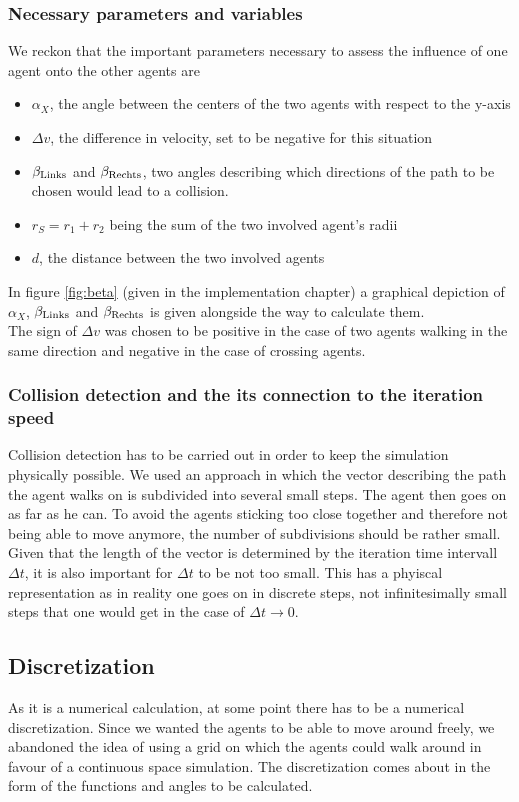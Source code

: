 \subsubsection{Necessary parameters and variables}
We reckon that the important parameters necessary to assess the influence of one agent onto the other agents are
\begin{itemize}
	\item $\alpha_X$, the angle between the centers of the two agents with respect to the y-axis
	\item $\Delta v$, the difference in velocity, set to be negative for this situation
	\item $\beta_{\text{Links}}$ and $\beta_{\text{Rechts}}$, two angles describing which directions of the path to be chosen would lead to a collision.
	\item $r_S = r_1 + r_2$ being the sum of the two involved agent's radii
	\item $d$, the distance between the two involved agents
\end{itemize}
\noi In figure \ref{fig:beta} (given in the implementation chapter) a graphical depiction of $\alpha_X$, $\beta_{\text{Links}}$ and $\beta_{\text{Rechts}}$ is given alongside the way to calculate them.\\
The sign of $\Delta v$ was chosen to be positive in the case of two agents walking in the same direction and negative in the case of crossing agents.

\subsubsection{Collision detection and the its connection to the iteration speed}
Collision detection has to be carried out in order to keep the simulation physically possible. We used an approach in which the vector describing the path the agent walks on is subdivided into several small steps. The agent then goes on as far as he can. To avoid the agents sticking too close together and therefore not being able to move anymore, the number of subdivisions should be rather small.\\
Given that the length of the vector is determined by the iteration time intervall $\Delta t$, it is also important for $\Delta t$ to be not too small. This has a phyiscal representation as in reality one goes on in discrete steps, not infinitesimally small steps that one would get in the case of $\Delta t \rightarrow 0$.

\subsection{Discretization}
As it is a numerical calculation, at some point there has to be a numerical discretization. Since we wanted the agents to be able to move around freely, we abandoned the idea of using a grid on which the agents could walk around in favour of a continuous space simulation. The discretization comes about in the form of the functions and angles to be calculated.

